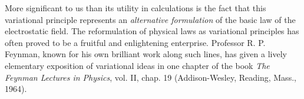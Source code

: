 More significant to us than its utility in calculations is the fact that
this variational principle represents an \emph{alternative formulation} of the
basic law of the electrostatic field. The reformulation of physical
laws as variational principles has often proved to be a fruitful and
enlightening enterprise. Professor R. P. Feynman, known for his
own brilliant work along such lines, has given a lively elementary
exposition of variational ideas in one chapter of the book \emph{The 
Feynman Lectures in Physics}, vol. II, chap. 19 (Addison-Wesley, Reading,
Mass., 1964).
